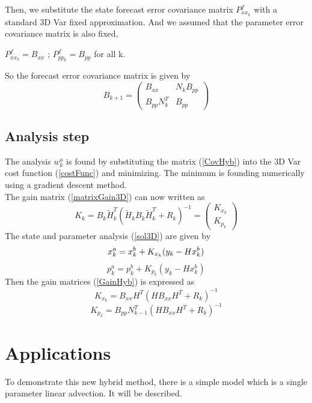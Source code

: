 \documentclass[a4,12pt]{article}
\numberwithin{equation}{section}
\begin{document}
Then, we substitute the state forecast error covariance matrix $P_{xx_k}^f $ with a standard 3D Var fixed approximation. And we assumed that the parameter error covariance matrix is also fixed, 
\begin{center}
    $P_{xx_k}^f =  B_{xx}$ ; $P_{pp_k}^f = B_{pp}$ for all k.
\end{center} 
So the forecast error covariance matrix is given by
\begin{equation}
    B_{k+1} = 
\begin{pmatrix}
B_{xx} & N_k B_{pp} \\
 B_{pp}N_k^T & B_{pp}
\end{pmatrix} 
\label{CovHyb}
\end{equation}

\subsection{Analysis step}
The analysis $w_k^a$ is found by substituting the matrix (\ref{CovHyb}) into the 3D Var cost function (\ref{costFunc}) and minimizing. The minimum is founding numerically using a gradient descent method. \\
The gain matrix (\ref{matrixGain3D}) can now written as 
\begin{equation}
K_k   =   B_k \tilde H_k^T(  \tilde H_k B_k \tilde H_k^T + R_k)^{-1} = \begin{pmatrix}
K_{x_k} \\
K_{p_k} 
\end{pmatrix} 
\label{GainHyb}
\end{equation}
The state and parameter analysis (\ref{sol3D}) are given by 
\begin{equation}
    x_k^a = x_k^b + K_{x_k} (y_k -  Hx_k^b) \\
\end{equation}
\begin{equation}
    p_k^a = p_k^b + K_{p_k} (y_k -  Hx_k^b)
\end{equation}
Then the gain matrices (\ref{GainHyb}) is expressed as 
\begin{equation}
K_{x_k} = B_{xx} H^T ( HB_{xx} H^T + R_k)^{-1}
\end{equation}
\begin{equation}
K_{p_k} = B_{pp} N_{k-1}^T ( HB_{xx} H^T + R_k)^{-1}
\end{equation}


\section{Applications}
To demonstrate this new hybrid method, there is a simple model which is a single parameter linear advection. It will be described.
\end{document}
